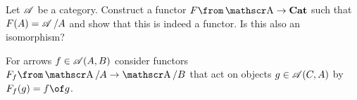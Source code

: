 \begin{exercise}
  Let $\operatorname{\mathscr A}$ be a category. Construct a functor $F\from \A\to\mathbf{Cat}$ such that $F(A)=\operatorname{\mathscr A}/A$ and show that this is indeed a functor. Is this also an isomorphism?

  \begin{hint}
    For arrows $f\in\operatorname{\mathscr A}(A,B)$ consider functors $F_f\from\A/A\to\A/B$ that act on objects $g\in \operatorname{\mathscr A}(C,A)$ by $F_f(g)=f\of g$. 
  \end{hint}
\end{exercise}









